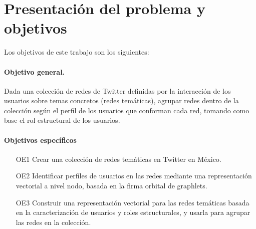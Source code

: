 \section{Presentación del problema y objetivos}
\label{sec:intro:motivación}

Los objetivos de este trabajo son los siguientes: 

\paragraph{Objetivo general.}
Dada una colección de redes de Twitter definidas por la interacción de los usuarios sobre temas concretos (redes temáticas), agrupar redes dentro de la colección según el perfil de los usuarios que conforman cada red, tomando como base el rol estructural de los usuarios.

\paragraph{Objetivos específicos}


\begin{itemize}
    \item[OE1] Crear una colección de redes temáticas en Twitter en México.
    \item[OE2] Identificar perfiles de usuarios en las redes mediante una representación vectorial a nivel nodo, basada en la firma orbital de graphlets. 
    \item[OE3] Construir una representación vectorial para las redes temáticas basada en la caracterización de usuarios y roles estructurales, y usarla para agrupar las redes en la colección.
\end{itemize}

